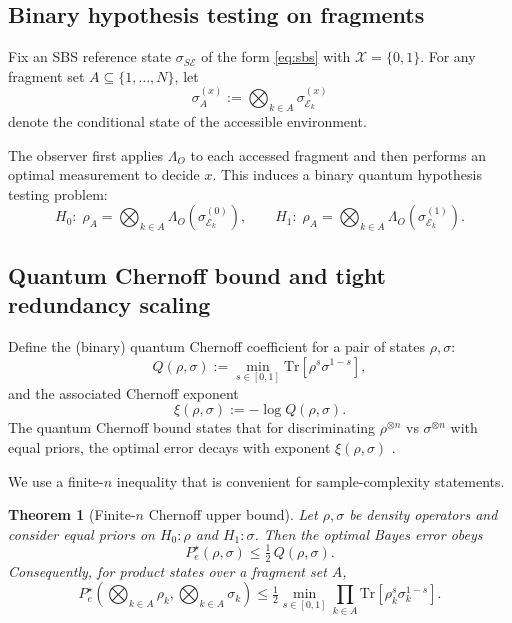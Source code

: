 \documentclass[11pt]{article}
\newcommand{\cE}{\mathcal{E}}
\newcommand{\cX}{\mathcal{X}}
\newcommand{\1}{\mathbf{1}}
\newcommand{\QCBcoef}{Q}
\newcommand{\QCBdist}{\xi}
\theoremstyle{definition}
\theoremstyle{plain}
\newtheorem{theorem}{Theorem}
\begin{document}
\subsection{Binary hypothesis testing on fragments}

Fix an SBS reference state $\sigma_{S\cE}$ of the form \eqref{eq:sbs} with $\cX=\{0,1\}$.
For any fragment set $A\subseteq\{1,\dots,N\}$, let
\[
\sigma^{(x)}_{A}:=\bigotimes_{k\in A}\sigma^{(x)}_{\cE_k}
\]
denote the conditional state of the accessible environment.

The observer first applies $\Lambda_O$ to each accessed fragment and then performs an optimal measurement to decide $x$.
This induces a binary quantum hypothesis testing problem:
\[
H_0:\;\rho_A=\bigotimes_{k\in A}\Lambda_O(\sigma^{(0)}_{\cE_k}),
\qquad
H_1:\;\rho_A=\bigotimes_{k\in A}\Lambda_O(\sigma^{(1)}_{\cE_k}).
\]

\subsection{Quantum Chernoff bound and tight redundancy scaling}

Define the (binary) quantum Chernoff coefficient for a pair of states $\rho,\sigma$:
\[
\QCBcoef(\rho,\sigma):=\min_{s\in[0,1]}\mathrm{Tr}\left[\rho^s\sigma^{1-s}\right],
\]
and the associated Chernoff exponent
\[
\QCBdist(\rho,\sigma):=-\log \QCBcoef(\rho,\sigma).
\]
The quantum Chernoff bound states that for discriminating $\rho^{\otimes n}$ vs $\sigma^{\otimes n}$ with equal priors, the optimal error decays with exponent $\QCBdist(\rho,\sigma)$ \citep{Audenaert2007,NussbaumSzkola2009}.

We use a finite-$n$ inequality that is convenient for sample-complexity statements.

\begin{theorem}[Finite-$n$ Chernoff upper bound]
\label{thm:chernoff-upper}
Let $\rho,\sigma$ be density operators and consider equal priors on $H_0:\rho$ and $H_1:\sigma$.
Then the optimal Bayes error obeys
\begin{equation}
P_e^\star(\rho,\sigma)\le \tfrac12\, \QCBcoef(\rho,\sigma).
\label{eq:pe-qcb}
\end{equation}
Consequently, for product states over a fragment set $A$,
\[
P_e^\star\!\left(\bigotimes_{k\in A}\rho_k,\bigotimes_{k\in A}\sigma_k\right)
\le \tfrac12 \min_{s\in[0,1]} \prod_{k\in A}\mathrm{Tr}\!\left[\rho_k^s\sigma_k^{1-s}\right].
\]
\end{theorem}
\end{document}
